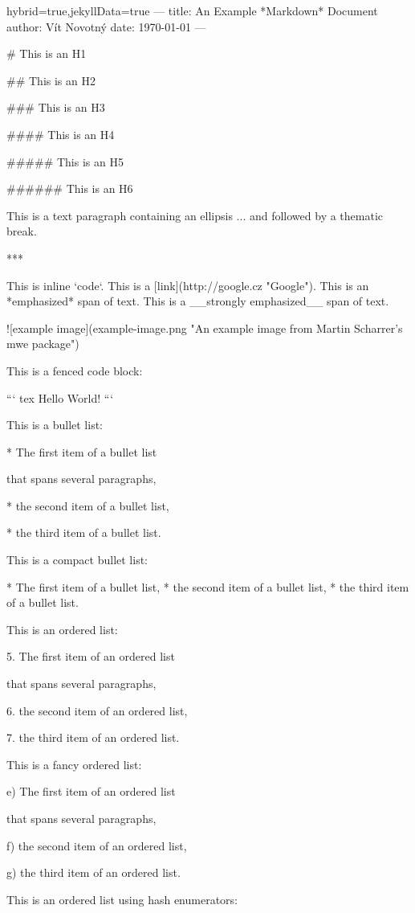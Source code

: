 \markdownBegin hybrid=true,jekyllData=true
---
title:  An Example *Markdown* Document
author: Vít Novotný
date:   \today
---

# This is an H1

## This is an H2

### This is an H3

#### This is an H4

##### This is an H5

###### This is an H6

This is a text paragraph containing an ellipsis ... and followed by a
thematic break.

***

This is inline `code`. This is a [link](http://google.cz "Google").
This is an *emphasized* span of text.
This is a __strongly emphasized__ span of text.

  ![example image](example-image.png "An example image from Martin Scharrer's mwe package")

This is a fenced code block:

``` tex
\fontfam[LMfonts]
Hello World! \bye
```

This is a bullet list:

* The first item of a bullet list

  that spans several paragraphs,

* the second item of a bullet list,

* the third item of a bullet list.

This is a compact bullet list:

* The first item of a bullet list,
* the second item of a bullet list,
* the third item of a bullet list.

This is an ordered list:

5. The first item of an ordered list

   that spans several paragraphs,

6. the second item of an ordered list,

7. the third item of an ordered list.

This is a fancy ordered list:

e) The first item of an ordered list

   that spans several paragraphs,

f) the second item of an ordered list,

g) the third item of an ordered list.

This is an ordered list using hash enumerators:


